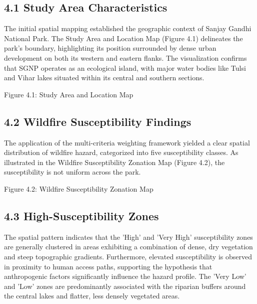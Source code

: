 \documentclass[12pt,a4paper]{article}
\begin{document}
\subsection*{4.1 Study Area Characteristics}

The initial spatial mapping established the geographic context of Sanjay Gandhi National Park. The Study Area and Location Map (Figure 4.1) delineates the park's boundary, highlighting its position surrounded by dense urban development on both its western and eastern flanks. The visualization confirms that SGNP operates as an ecological island, with major water bodies like Tulsi and Vihar lakes situated within its central and southern sections.


Figure 4.1: Study Area and Location Map



\subsection*{4.2 Wildfire Susceptibility Findings}

The application of the multi-criteria weighting framework yielded a clear spatial distribution of wildfire hazard, categorized into five susceptibility classes. As illustrated in the Wildfire Susceptibility Zonation Map (Figure 4.2), the susceptibility is not uniform across the park.


Figure 4.2: Wildfire Susceptibility Zonation Map



\subsection*{4.3 High-Susceptibility Zones}

The spatial pattern indicates that the 'High' and 'Very High' susceptibility zones are generally clustered in areas exhibiting a combination of dense, dry vegetation and steep topographic gradients. Furthermore, elevated susceptibility is observed in proximity to human access paths, supporting the hypothesis that anthropogenic factors significantly influence the hazard profile. The 'Very Low' and 'Low' zones are predominantly associated with the riparian buffers around the central lakes and flatter, less densely vegetated areas.
\end{document}
